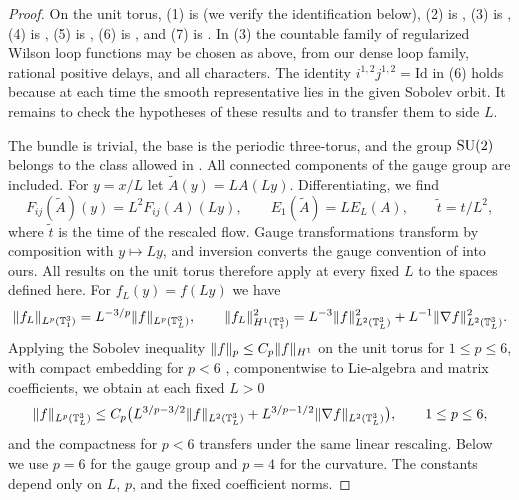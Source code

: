 \begin{proof}
On the unit torus, (1) is \cite[Definition 3.5 and (3.2), p.~22]{CCState2023v4} (we verify the identification below), (2) is \cite[Lemma 3.7, p.~23]{CCState2023v4}, (3) is \cite[Lemma 3.49, p.~35; Definition 3.50 and Theorem 3.51, pp.~35--36]{CCState2023v4}, (4) is \cite[Lemma 3.68, p.~40]{CCState2023v4}, (5) is \cite[Definitions 3.70 and 3.74, pp.~41--42; Lemmas 3.75 and 3.78, pp.~42--44]{CCState2023v4}, (6) is \cite[Lemma 3.10, p.~24; Lemmas 3.84--3.85, pp.~47--48; Definition 3.86 and Lemmas 3.87--3.89, pp.~48--49]{CCState2023v4}, and (7) is \cite[Definition 3.82, p.~47]{CCState2023v4}. In (3) the countable family of regularized Wilson loop functions may be chosen as above, from our dense loop family, rational positive delays, and all characters. The identity $i^{1,2}j^{1,2}=\mathrm{Id}$ in (6) holds because at each time the smooth representative lies in the given Sobolev orbit. It remains to check the hypotheses of these results and to transfer them to side $L$.

The bundle is trivial, the base is the periodic three-torus, and the group $\mathrm{SU}(2)$ belongs to the class allowed in \cite[Section 1.1, p.~2]{CCState2023v4}. All connected components of the gauge group are included. For $y=x/L$ let $\widetilde A(y)=LA(Ly)$. Differentiating, we find
\[
 F_{ij}(\widetilde A)(y)=L^2F_{ij}(A)(Ly),\qquad E_1(\widetilde A)=LE_L(A),\qquad \widetilde t=t/L^2,
\]
where $\widetilde t$ is the time of the rescaled flow. Gauge transformations transform by composition with $y\mapsto Ly$, and inversion converts the gauge convention of \cite{CCState2023v4} into ours. All results on the unit torus therefore apply at every fixed $L$ to the spaces defined here. For $f_L(y)=f(Ly)$ we have
\[
 \lVert f_L\rVert_{L^p(\mathbb T^3_1)}=L^{-3/p}\lVert f\rVert_{L^p(\mathbb T_L^3)},\qquad
 \lVert f_L\rVert_{H^1(\mathbb T_1^3)}^2=L^{-3}\lVert f\rVert_{L^2(\mathbb T_L^3)}^2+L^{-1}\lVert \nabla f\rVert_{L^2(\mathbb T_L^3)}^2 .
\]
Applying the Sobolev inequality $\lVert f\rVert_p\le C_p\lVert f\rVert_{H^1}$ on the unit torus for $1\le p\le6$, with compact embedding for $p<6$ \cite[Theorem 3.3, p.~21]{CCState2023v4}, componentwise to Lie-algebra and matrix coefficients, we obtain at each fixed $L>0$
\begin{equation}\label{ch26:eq:sobolev-rescaling}
 \lVert f\rVert_{L^p(\mathbb T_L^3)}\le C_p\bigl(L^{3/p-3/2}\lVert f\rVert_{L^2(\mathbb T_L^3)}+L^{3/p-1/2}\lVert \nabla f\rVert_{L^2(\mathbb T_L^3)}\bigr),\qquad 1\le p\le6,
\end{equation}
and the compactness for $p<6$ transfers under the same linear rescaling. Below we use $p=6$ for the gauge group and $p=4$ for the curvature. The constants depend only on $L$, $p$, and the fixed coefficient norms.


\end{proof}
